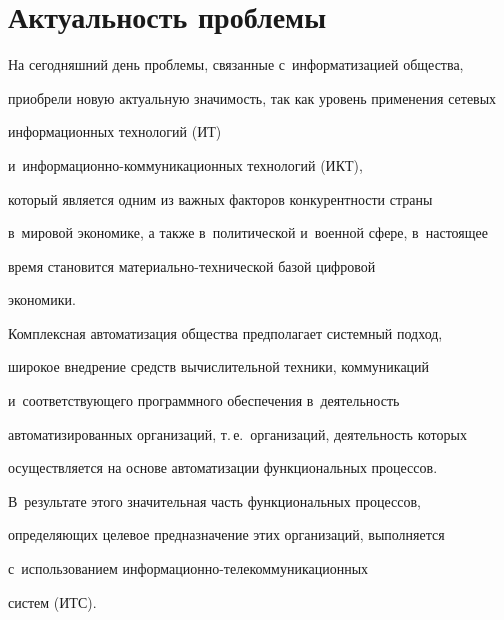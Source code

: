       




     


     \vspace*{-20pt}


  


  \section{Актуальность проблемы}


  


  На сегодняшний день проблемы, связанные с~информатизацией общества, 


приобрели новую актуальную значимость, так как уровень применения сетевых 


информационных технологий (ИТ)  


и~ин\-фор\-ма\-ци\-он\-но-ком\-му\-ни\-ка\-ци\-он\-ных технологий (ИКТ), 


который является одним из важных факторов конкурентности страны 


в~мировой экономике, а также в~политической и~военной сфере, в~настоящее 


время становится ма\-те\-ри\-аль\-но-тех\-ни\-че\-ской базой цифровой 


экономики.


  


  Комплексная автоматизация общества предполагает сис\-тем\-ный подход, 


широкое внедрение средств вычислительной техники, коммуникаций 


и~соответствующего программного обеспечения в~деятельность 


автоматизированных организаций, т.\,е.\ организаций, деятельность которых 


осуществляется на основе автоматизации функциональных процессов. 


В~результате этого значительная часть функциональных процессов, 


определяющих целевое предназначение этих организаций, выполняется 


с~использованием ин\-фор\-ма\-ци\-он\-но-те\-ле\-ком\-му\-ни\-ка\-ци\-он\-ных 


сис\-тем (ИТС).


